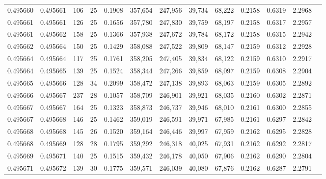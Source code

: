 \begin{tabular}{rrrrrrrrrrrrr}
0.495660 & 0.495661 & 106 &  25 &                                     0.1908 & 357,654 & 247,956 &  39,734 &  68,222 & 0.2158 & 0.6319 & 2.2968 \\
0.495661 & 0.495661 & 126 &  25 &                                     0.1656 & 357,780 & 247,830 &  39,759 &  68,197 & 0.2158 & 0.6317 & 2.2957 \\
0.495661 & 0.495662 & 158 &  25 &                                     0.1366 & 357,938 & 247,672 &  39,784 &  68,172 & 0.2158 & 0.6315 & 2.2942 \\
0.495662 & 0.495664 & 150 &  25 &                                     0.1429 & 358,088 & 247,522 &  39,809 &  68,147 & 0.2159 & 0.6312 & 2.2928 \\
0.495664 & 0.495664 & 117 &  25 &                                     0.1761 & 358,205 & 247,405 &  39,834 &  68,122 & 0.2159 & 0.6310 & 2.2917 \\
0.495664 & 0.495665 & 139 &  25 &                                     0.1524 & 358,344 & 247,266 &  39,859 &  68,097 & 0.2159 & 0.6308 & 2.2904 \\
0.495665 & 0.495666 & 128 &  34 &                                     0.2099 & 358,472 & 247,138 &  39,893 &  68,063 & 0.2159 & 0.6305 & 2.2892 \\
0.495666 & 0.495667 & 237 &  28 &                                     0.1057 & 358,709 & 246,901 &  39,921 &  68,035 & 0.2160 & 0.6302 & 2.2871 \\
0.495667 & 0.495667 & 164 &  25 &                                     0.1323 & 358,873 & 246,737 &  39,946 &  68,010 & 0.2161 & 0.6300 & 2.2855 \\
0.495667 & 0.495668 & 146 &  25 &                                     0.1462 & 359,019 & 246,591 &  39,971 &  67,985 & 0.2161 & 0.6297 & 2.2842 \\
0.495668 & 0.495668 & 145 &  26 &                                     0.1520 & 359,164 & 246,446 &  39,997 &  67,959 & 0.2162 & 0.6295 & 2.2828 \\
0.495668 & 0.495669 & 128 &  28 &                                     0.1795 & 359,292 & 246,318 &  40,025 &  67,931 & 0.2162 & 0.6292 & 2.2817 \\
0.495669 & 0.495671 & 140 &  25 &                                     0.1515 & 359,432 & 246,178 &  40,050 &  67,906 & 0.2162 & 0.6290 & 2.2804 \\
0.495671 & 0.495672 & 139 &  30 &                                     0.1775 & 359,571 & 246,039 &  40,080 &  67,876 & 0.2162 & 0.6287 & 2.2791 \\

\end{tabular}

